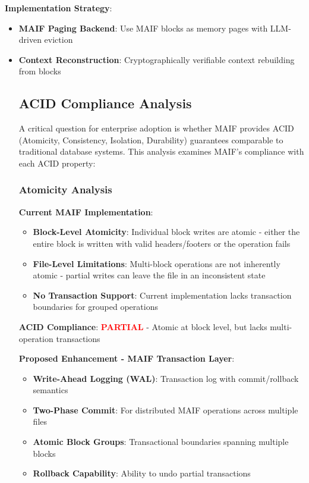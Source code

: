 \documentclass[conference]{IEEEtran}
\begin{document}
\textbf{Implementation Strategy}:
\begin{itemize}[leftmargin=*]
\item \textbf{MAIF Paging Backend}: Use MAIF blocks as memory pages with LLM-driven eviction
\item \textbf{Context Reconstruction}: Cryptographically verifiable context rebuilding from blocks
\subsection{ACID Compliance Analysis}

A critical question for enterprise adoption is whether MAIF provides ACID (Atomicity, Consistency, Isolation, Durability) guarantees comparable to traditional database systems. This analysis examines MAIF's compliance with each ACID property:

\subsubsection{Atomicity Analysis}

\textbf{Current MAIF Implementation}:
\begin{itemize}[leftmargin=*]
\item \textbf{Block-Level Atomicity}: Individual block writes are atomic - either the entire block is written with valid headers/footers or the operation fails
\item \textbf{File-Level Limitations}: Multi-block operations are not inherently atomic - partial writes can leave the file in an inconsistent state
\item \textbf{No Transaction Support}: Current implementation lacks transaction boundaries for grouped operations
\end{itemize}

\textbf{ACID Compliance}: \textcolor{red}{\textbf{PARTIAL}} - Atomic at block level, but lacks multi-operation transactions

\textbf{Proposed Enhancement - MAIF Transaction Layer}:
\begin{itemize}[leftmargin=*]
\item \textbf{Write-Ahead Logging (WAL)}: Transaction log with commit/rollback semantics
\item \textbf{Two-Phase Commit}: For distributed MAIF operations across multiple files
\item \textbf{Atomic Block Groups}: Transactional boundaries spanning multiple blocks
\item \textbf{Rollback Capability}: Ability to undo partial transactions
\end{itemize}


\end{itemize}
\end{document}
